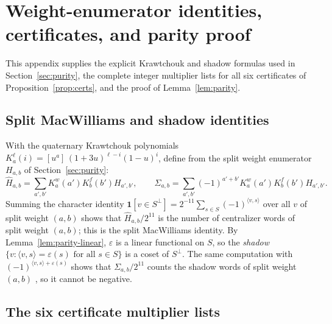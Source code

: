 \documentclass[11pt]{article}
\theoremstyle{definition}
\theoremstyle{remark}
\begin{document}
\appendix

\section{Weight-enumerator identities, certificates, and parity proof}\label{app:purity}

This appendix supplies the explicit Krawtchouk and shadow formulas used
in Section~\ref{sec:purity}, the complete integer multiplier lists for
all six certificates of Proposition~\ref{prop:certs}, and the proof of
Lemma~\ref{lem:parity}.

\subsection{Split MacWilliams and shadow identities}

With the quaternary Krawtchouk polynomials
\(K^\ell_a(i)=[u^a]\,(1+3u)^{\ell-i}(1-u)^i\), define from the split
weight enumerator \(H_{a,b}\) of Section~\ref{sec:purity}:
\[
 \widehat H_{a,b}=\sum_{a',b'}K^w_a(a')K^f_b(b')H_{a',b'},\qquad
 \Sigma_{a,b}=\sum_{a',b'}(-1)^{a'+b'}K^w_a(a')K^f_b(b')H_{a',b'}.
\]
Summing the character identity
\(\mathbf 1[v\in S^\perp]=2^{-11}\sum_{s\in S}(-1)^{\langle v,s\rangle}\)
over all \(v\) of split weight \((a,b)\) shows that
\(\widehat H_{a,b}/2^{11}\) is the number of centralizer words of split
weight \((a,b)\); this is the split MacWilliams identity. By
Lemma~\ref{lem:parity-linear}, \(\varepsilon\) is a linear functional on
\(S\), so the \emph{shadow}
\(\{v:\langle v,s\rangle=\varepsilon(s)\text{ for all }s\in S\}\) is a
coset of \(S^\perp\). The same computation with
\((-1)^{\langle v,s\rangle+\varepsilon(s)}\) shows that
\(\Sigma_{a,b}/2^{11}\) counts the shadow words of split weight
\((a,b)\) \cite{rains}, so it cannot be negative.

\subsection{The six certificate multiplier lists}
\end{document}
